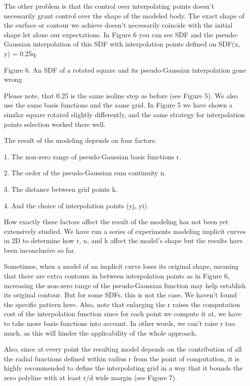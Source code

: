 \documentclass[12pt,a4paper]{article}
\begin{document}
\par
The other problem is that the control over interpolating points doesn’t necessarily grant control over the shape of the modeled body. The exact shape of the surface or contour we achieve doesn’t necessarily coincide with the initial shape let alone our expectations. In Figure 6 you can see SDF and the pseudo-Gaussian interpolation of this SDF with interpolation points defined on SDF(x, y) = 0.25q.
\par
Figure 6. An SDF of a rotated square and its pseudo-Gaussian interpolation gone wrong
\par
Please note, that 0.25 is the same isoline step as before (see Figure 5). We also use the same basis functions and the same grid. In Figure 5 we have shown a similar square rotated slightly differently, and the same strategy for interpolation points selection worked there well.
\par
The result of the modeling depends on four factors:
\par
1. The non-zero range of pseudo-Gaussian basis functions r.
\par
2. The order of the pseudo-Gaussian sum continuity n.
\par
3. The distance between grid points k.
\par
4. And the choice of interpolation points (yj, yi).
\par
How exactly these factors affect the result of the modeling has not been yet extensively studied. We have run a series of experiments modeling implicit curves in 2D to determine how r, n, and k affect the model's shape but the results have been inconclusive so far.
\par
Sometimes, when a model of an implicit curve loses its original shape, meaning that there are extra contours in between interpolation points as in Figure 6, increasing the non-zero range of the pseudo-Gaussian function may help establish its original contour. But for some SDFs, this is not the case. We haven’t found the specific pattern here. Also, note that enlarging the r raises the computation cost of the interpolation function since for each point we compute it at, we have to take more basis functions into account. In other words, we can’t raise r too much, as this will hinder the applicability of the whole approach.
\par
Also, since at every point the resulting model depends on the contribution of all the radial functions defined within radius r from the point of computation, it is highly recommended to define the interpolating grid in a way that it bounds the zero polyline with at least r/d wide margin (see Figure 7).
\end{document}
